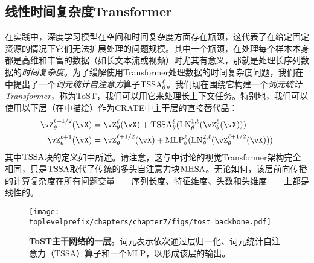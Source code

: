 \documentclass[../../book-main.tex]{subfiles}
\begin{document}

\subsection{线性时间复杂度Transformer}\label{sub:tost_experiments}

在实践中，深度学习模型在空间和时间复杂度方面存在瓶颈，这代表了在给定固定资源的情况下它们无法扩展处理的问题规模。其中一个瓶颈，在处理每个样本本身都是高维和丰富的数据（如长文本流或视频）时尤其有意义，那就是处理长序列数据的\textit{时间复杂度}。为了缓解使用Transformer处理数据的时间复杂度问题，我们在中提出了一个\textit{词元统计自注意力}算子\(\operatorname{TSSA}_{\theta}^{\ell}\)。我们现在围绕它构建一个\textit{词元统计Transformer}，称为ToST，我们可以用它来处理长上下文任务。特别地，我们可以使用以下层（在中描绘）作为CRATE中主干层的直接替代品：
\begin{align}
    \vZ_{\theta}^{\ell + 1/2}(\vX)
    &= \vZ_{\theta}^{\ell}(\vX) + \TSSA_{\theta}^{\ell}(\LN_{\theta}^{1, \ell}(\vZ_{\theta}^{\ell}(\vX))) \\ 
    \vZ_{\theta}^{\ell + 1}(\vX)
    &= \vZ_{\theta}^{\ell + 1/2}(\vX) + \MLP_{\theta}^{\ell}(\LN_{\theta}^{2, \ell}(\vZ_{\theta}^{\ell + 1/2}(\vX)))
\end{align}
其中\(\operatorname{TSSA}\)块的定义如中所述。请注意，这与中讨论的视觉Transformer架构完全相同，只是\(\operatorname{TSSA}\)取代了传统的多头自注意力块\(\operatorname{MHSA}\)。无论如何，该层前向传播的计算复杂度在所有问题变量——序列长度、特征维度、头数和头维度——上都是线性的。

\begin{figure}
    \centering 
    \texttt{[image: \\toplevelprefix/chapters/chapter7/figs/tost\_backbone.pdf]}
    \caption{\small\textbf{ToST主干网络的一层}。词元表示依次通过层归一化、词元统计自注意力（TSSA）算子和一个MLP，以形成该层的输出。}
    \label{fig:tost_backbone}
\end{figure}
\end{document}
